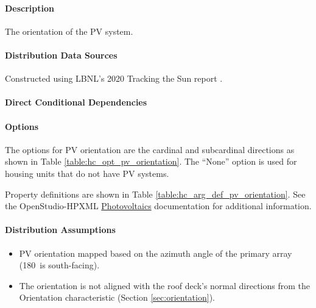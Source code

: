 \paragraph{Description}
% 
The orientation of the PV system.

\paragraph{Distribution Data Sources}
% 
Constructed using LBNL's 2020 Tracking the Sun report \citep{LBNLTTS2019}.

\paragraph{Direct Conditional Dependencies}


\paragraph{Options}
The options for PV orientation are the cardinal and subcardinal directions as shown in Table \ref{table:hc_opt_pv_orientation}. The ``None'' option is used for housing units that do not have PV systems.



Property definitions are shown in Table \ref{table:hc_arg_def_pv_orientation}. See the OpenStudio-HPXML \href{https://openstudio-hpxml.readthedocs.io/en/v1.10.0/workflow_inputs.html#hpxml-photovoltaics}{Photovoltaics} documentation for additional information.



\paragraph{Distribution Assumptions}
% 
\begin{itemize}
    \item PV orientation mapped based on the azimuth angle of the primary array (180\degree~is south-facing).
    \item The orientation is not aligned with the roof deck's normal directions from the Orientation characteristic (Section \ref{sec:orientation}).
\end{itemize}
